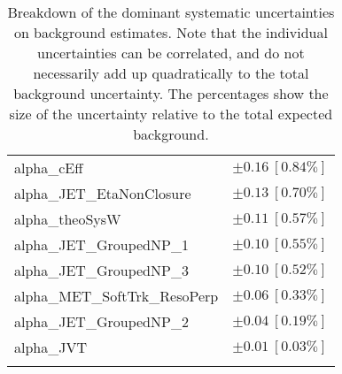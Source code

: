 \begin{table}
\begin{center}
\begin{tabular*}{\textwidth}{@{\extracolsep{\fill}}lc}
alpha\_cEff         & $\pm 0.16\ [0.84\%] $       \\
alpha\_JET\_EtaNonClosure         & $\pm 0.13\ [0.70\%] $       \\
alpha\_theoSysW         & $\pm 0.11\ [0.57\%] $       \\
alpha\_JET\_GroupedNP\_1         & $\pm 0.10\ [0.55\%] $       \\
alpha\_JET\_GroupedNP\_3         & $\pm 0.10\ [0.52\%] $       \\
alpha\_MET\_SoftTrk\_ResoPerp         & $\pm 0.06\ [0.33\%] $       \\
alpha\_JET\_GroupedNP\_2         & $\pm 0.04\ [0.19\%] $       \\
alpha\_JVT         & $\pm 0.01\ [0.03\%] $       \\
\noalign{\smallskip}\hline\noalign{\smallskip}
\end{tabular*}
\end{center}
\caption[Breakdown of uncertainty on background estimates]{
Breakdown of the dominant systematic uncertainties on background estimates.
Note that the individual uncertainties can be correlated, and do not necessarily add up quadratically to 
the total background uncertainty. The percentages show the size of the uncertainty relative to the total expected background.
\label{table.results.bkgestimate.uncertainties.SRA_T0}}
\end{table}
%